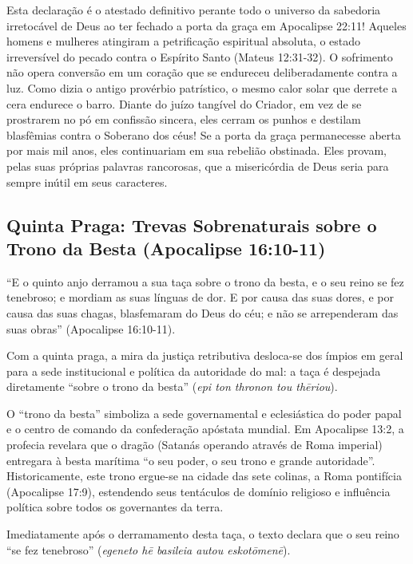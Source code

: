 Esta declaração é o atestado definitivo perante todo o universo da sabedoria irretocável de Deus ao ter fechado a porta da graça em Apocalipse 22:11! Aqueles homens e mulheres atingiram a petrificação espiritual absoluta, o estado irreversível do pecado contra o Espírito Santo (Mateus 12:31-32). O sofrimento não opera conversão em um coração que se endureceu deliberadamente contra a luz. Como dizia o antigo provérbio patrístico, o mesmo calor solar que derrete a cera endurece o barro. Diante do juízo tangível do Criador, em vez de se prostrarem no pó em confissão sincera, eles cerram os punhos e destilam blasfêmias contra o Soberano dos céus! Se a porta da graça permanecesse aberta por mais mil anos, eles continuariam em sua rebelião obstinada. Eles provam, pelas suas próprias palavras rancorosas, que a misericórdia de Deus seria para sempre inútil em seus caracteres.



\subsection{Quinta Praga: Trevas Sobrenaturais sobre o Trono da Besta (Apocalipse 16:10-11)}


``E o quinto anjo derramou a sua taça sobre o trono da besta, e o seu reino se fez tenebroso; e mordiam as suas línguas de dor. E por causa das suas dores, e por causa das suas chagas, blasfemaram do Deus do céu; e não se arrependeram das suas obras'' (Apocalipse 16:10-11).

Com a quinta praga, a mira da justiça retributiva desloca-se dos ímpios em geral para a sede institucional e política da autoridade do mal: a taça é despejada diretamente ``sobre o trono da besta'' (\textit{epi ton thronon tou thēriou}).

O ``trono da besta'' simboliza a sede governamental e eclesiástica do poder papal e o centro de comando da confederação apóstata mundial. Em Apocalipse 13:2, a profecia revelara que o dragão (Satanás operando através de Roma imperial) entregara à besta marítima ``o seu poder, o seu trono e grande autoridade''. Historicamente, este trono ergue-se na cidade das sete colinas, a Roma pontifícia (Apocalipse 17:9), estendendo seus tentáculos de domínio religioso e influência política sobre todos os governantes da terra.

Imediatamente após o derramamento desta taça, o texto declara que o seu reino ``se fez tenebroso'' (\textit{egeneto hē basileia autou eskotōmenē}).

